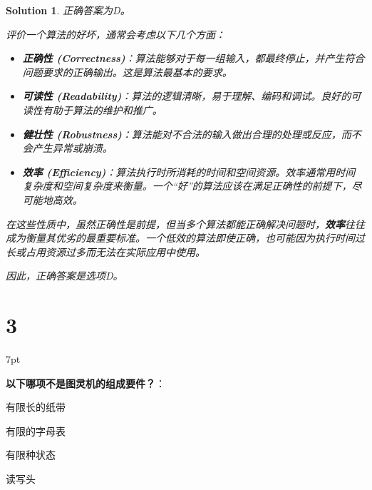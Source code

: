 \documentclass[UTF8]{report}
\newtheorem{solution}{Solution}
\theoremstyle{MyLineTheoremStyle} %
\theoremstyle{MyBlockTheoremStyle} %
\theoremstyle{MySubsubsectionStyle} %
\newenvironment{graybox}{%
        \def\FrameCommand{%
        \hspace{1pt}%
        {\color{gray}\small \vrule width 2pt}%
        {\color{graybox_color}\vrule width 4pt}%
        \colorbox{graybox_color}%
        }%
        \MakeFramed{\advance\hsize-\width\FrameRestore}%
        \noindent\hspace{-4.55pt}%
        \begin{adjustwidth}{}{7pt}%
        \vspace{2pt}\vspace{2pt}%
        }
        {%
        \vspace{2pt}\end{adjustwidth}\endMakeFramed%
        }
\begin{document}
\begin{solution}
正确答案为D。

评价一个算法的好坏，通常会考虑以下几个方面：
\begin{itemize}
    \item \textbf{正确性 (Correctness)}：算法能够对于每一组输入，都最终停止，并产生符合问题要求的正确输出。这是算法最基本的要求。
    \item \textbf{可读性 (Readability)}：算法的逻辑清晰，易于理解、编码和调试。良好的可读性有助于算法的维护和推广。
    \item \textbf{健壮性 (Robustness)}：算法能对不合法的输入做出合理的处理或反应，而不会产生异常或崩溃。
    \item \textbf{效率 (Efficiency)}：算法执行时所消耗的时间和空间资源。效率通常用时间复杂度和空间复杂度来衡量。一个“好”的算法应该在满足正确性的前提下，尽可能地高效。
\end{itemize}
在这些性质中，虽然正确性是前提，但当多个算法都能正确解决问题时，\textbf{效率}往往成为衡量其优劣的最重要标准。一个低效的算法即使正确，也可能因为执行时间过长或占用资源过多而无法在实际应用中使用。

因此，正确答案是选项D。
\end{solution}

\section*{3}

\begin{graybox}
\textbf{以下哪项不是图灵机的组成要件？}：
\begin{circledenum}
    \item 有限长的纸带
    \item 有限的字母表
    \item 有限种状态
    \item 读写头
\end{circledenum}
\end{graybox}
\end{document}
